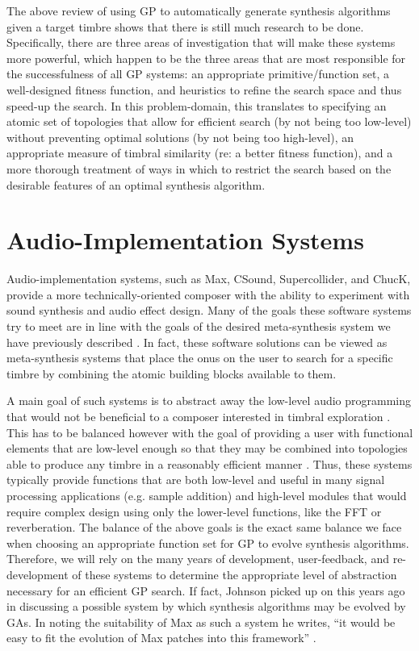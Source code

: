 \documentclass[a4paper,12pt]{report} 	%
\numberwithin{figure}{chapter}
\numberwithin{table}{chapter}
\numberwithin{equation}{chapter}
\begin{document}
\begin{flushleft}
The above review of using GP to automatically generate synthesis algorithms given a target timbre shows that there is still much research to be done. Specifically, there are three areas of investigation that will make these systems more powerful, which happen to be the three areas that are most responsible for the successfulness of all GP systems: an appropriate primitive/function set, a well-designed fitness function, and heuristics to refine the search space and thus speed-up the search. In this problem-domain, this translates to specifying an atomic set of topologies that allow for efficient search (by not being too low-level) without preventing optimal solutions (by not being too high-level), an appropriate measure of timbral similarity (re: a better fitness function), and a more thorough treatment of ways in which to restrict the search based on the desirable features of an optimal synthesis algorithm. 

\section{Audio-Implementation Systems}

Audio-implementation systems, such as Max, CSound, Supercollider, and ChucK, provide a more technically-oriented composer with the ability to experiment with sound synthesis and audio effect design. Many of the goals these software systems try to meet are in line with the goals of the desired meta-synthesis system we have previously described \cite{Moreno:2005bs}. In fact, these software solutions can be viewed as meta-synthesis systems that place the onus on the user to search for a specific timbre by combining the atomic building blocks available to them. 

A main goal of such systems is to abstract away the low-level audio programming that would not be beneficial to a composer interested in timbral exploration \cite[p. 1]{Moreno:2005bs}. This has to be balanced however with the goal of providing a user with functional elements that are low-level enough so that they may be combined into topologies able to produce any timbre in a reasonably efficient manner \cite[p. 1]{Moreno:2005bs}. Thus, these systems typically provide functions that are both low-level and useful in many signal processing applications (e.g. sample addition) and high-level modules that would require complex design using only the lower-level functions, like the FFT or reverberation. The balance of the above goals is the exact same balance we face when choosing an appropriate function set for GP to evolve synthesis algorithms. Therefore, we will rely on the many years of development, user-feedback, and re-development of these systems to determine the appropriate level of abstraction necessary for an efficient GP search. If fact, Johnson picked up on this years ago in discussing a possible system by which synthesis algorithms may be evolved by GAs. In noting the suitability of Max as such a system he writes, ``it would be easy to fit the evolution of Max patches into this framework'' \cite[p. 6]{Johnson:1998sh}.


\end{flushleft}
\end{document}
